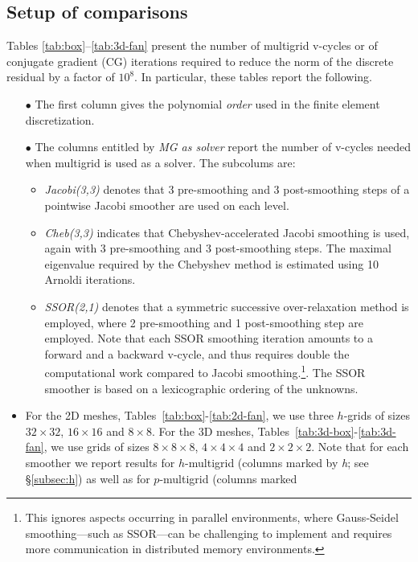 \documentclass[smallcondensed,final]{svjour3}     %
\begin{document}
\subsection{Setup of comparisons}\label{subsec:measures}
Tables \ref{tab:box}--\ref{tab:3d-fan} present the number of multigrid
v-cycles or of conjugate gradient (CG) iterations required to reduce
the norm of the discrete residual by a factor of $10^8$. In
particular, these tables report the following.
\begin{itemize}
\item[$\bullet$] The first column gives the polynomial \emph{order}
  used in the finite element discretization.
\item[$\bullet$] The columns entitled by \emph{MG as solver} report
  the number of v-cycles needed when multigrid is used as a
  solver. The subcolums are:
  \begin{itemize}
  \item \emph{Jacobi(3,3)} denotes that 3 pre-smoothing and 3
    post-smoothing steps of a pointwise Jacobi smoother are used on
    each level.
  \item \emph{Cheb(3,3)} indicates that Chebyshev-accelerated Jacobi
    smoothing is used, again with 3 pre-smoothing and 3
    post-smoothing steps. The maximal eigenvalue required by the
    Chebyshev method is estimated using 10 Arnoldi iterations.
  \item \emph{SSOR(2,1)} denotes that a symmetric successive
    over-relaxation method is employed, where 2 pre-smoothing and 1
    post-smoothing step are employed. Note that each SSOR smoothing
    iteration amounts to a forward and a backward v-cycle, and thus
    requires double the computational work compared to Jacobi
    smoothing.\footnote{This ignores aspects occurring in parallel
      environments, where Gauss-Seidel smoothing---such as SSOR---can
      be challenging to implement and requires more communication in
      distributed memory environments.}. The SSOR smoother is based on 
			a lexicographic ordering of  the unknowns. 
  \end{itemize}
  \item For the 2D meshes, Tables~\ref{tab:box}-\ref{tab:2d-fan}, we use 
  three $h$-grids of sizes $32\times32$, $16\times16$ and $8\times8$. For 
  the 3D meshes, Tables~\ref{tab:3d-box}-\ref{tab:3d-fan}, we use grids of 
  sizes $8\times8\times8$, $4\times4\times4$ and $2\times2\times2$.
  Note that for each smoother we report results for
  $h$-multigrid (columns marked by \emph{h}; see
  \S\ref{subsec:h}) as well as for $p$-multigrid (columns marked

\end{itemize}
\end{document}
